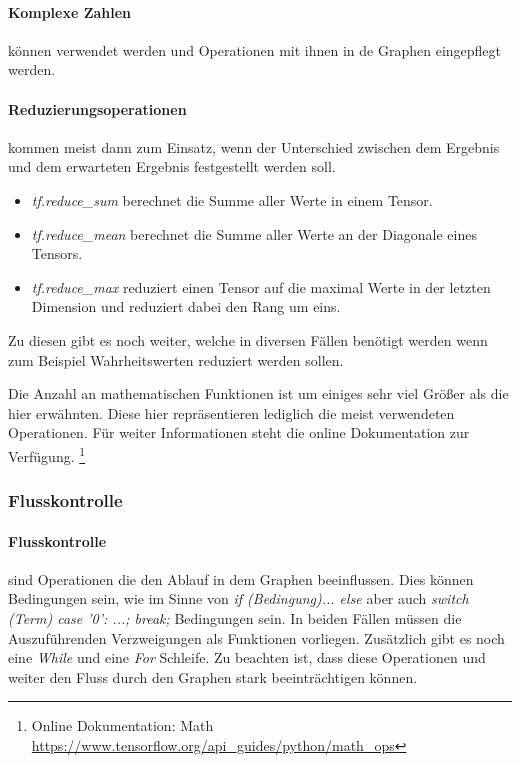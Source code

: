 \paragraph{Komplexe Zahlen} können verwendet werden und Operationen mit ihnen in de Graphen eingepflegt werden. 

\paragraph{Reduzierungsoperationen} kommen meist dann zum Einsatz, wenn der Unterschied zwischen dem Ergebnis und dem erwarteten Ergebnis festgestellt werden soll. 
\begin{itemize}
	\item \textit{tf.reduce\_sum} berechnet die Summe aller Werte in einem Tensor.
	\item \textit{tf.reduce\_mean} berechnet die Summe aller Werte an der Diagonale eines Tensors. 
	\item \textit{tf.reduce\_max} reduziert einen Tensor auf die maximal Werte in der letzten Dimension und reduziert dabei den Rang um eins.
\end{itemize}

\noindent
Zu diesen gibt es noch weiter, welche in diversen Fällen benötigt werden wenn zum Beispiel Wahrheitswerten reduziert werden sollen. \newline

\noindent
Die Anzahl an mathematischen Funktionen ist um einiges sehr viel Größer als die hier erwähnten. 
Diese hier repräsentieren lediglich die meist verwendeten Operationen. 
Für weiter Informationen steht die online Dokumentation zur Verfügung. \footnote{Online Dokumentation: Math \url{https://www.tensorflow.org/api_guides/python/math_ops}}

\subsubsection{Flusskontrolle}

\paragraph{Flusskontrolle} sind Operationen die den Ablauf in dem Graphen beeinflussen. 
Dies können Bedingungen sein, wie im Sinne von \textit{if (Bedingung){...} else {}} aber auch \textit{switch (Term) { case '0': ...; break;}} Bedingungen sein. 
In beiden Fällen müssen die Auszuführenden Verzweigungen als Funktionen vorliegen. 
Zusätzlich gibt es noch eine \textit{While} und eine \textit{For} Schleife. 
Zu beachten ist, dass diese Operationen und weiter den Fluss durch den Graphen stark beeinträchtigen können.

